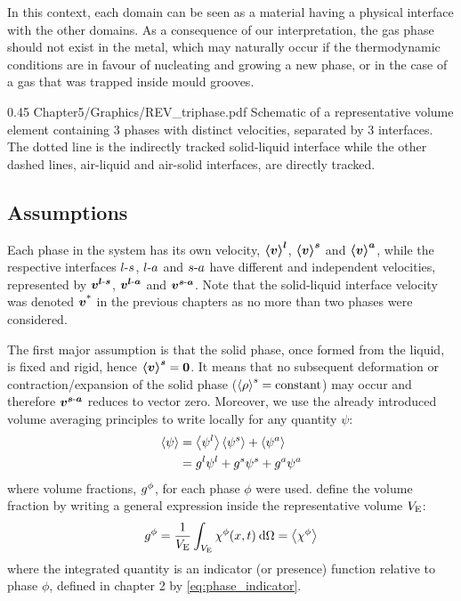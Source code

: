 In this context, each domain can be seen as a material having a physical
interface with the other domains. As a consequence of our interpretation, 
the gas phase should not exist in the metal, which may naturally
occur if the thermodynamic conditions are in favour of nucleating and growing 
a new phase, or in the case of a gas that was trapped inside mould grooves.
\begin{figureth}
{0.45}
{Chapter5/Graphics/REV_triphase.pdf}
{Schematic of a representative volume element containing 3 phases with distinct velocities, separated by 3 interfaces.
The dotted line is the indirectly tracked solid-liquid interface while the other dashed lines, air-liquid and air-solid
interfaces, are directly tracked.}
\label{fig:rev_triphase}
\end{figureth}

\subsection{Assumptions}
Each phase in the system has its own velocity, $\boldsymbol{\left \langle v \right \rangle^l}$, $\boldsymbol{\left \langle v \right \rangle^s}$ and $\boldsymbol{\left \langle v \right \rangle^a}$, while the respective
interfaces $l\text{-}s$, $l\text{-}a$ and $s\text{-}a$ have different and independent velocities, 
represented by $\boldsymbol{v^{l\text{-}s}}$, $\boldsymbol{v^{l\text{-}a}}$ and $\boldsymbol{v^{s\text{-}a}}$. Note that the solid-liquid interface
velocity was denoted $\boldsymbol{v^\text{*}}$ in the previous chapters as no more than two phases were considered.

The first major assumption is that the solid phase, once formed from the liquid, is fixed and rigid, hence $\boldsymbol{\left \langle v \right \rangle^s}=\boldsymbol{0}$.
It means that no subsequent deformation or contraction/expansion of the solid phase ($\left \langle \rho \right \rangle^s=\text{constant}$) may occur and therefore $\boldsymbol{v^{s\text{-}a}}$ reduces to vector zero.
Moreover, we use the already introduced volume averaging principles to write locally for any quantity $\psi$:
\begin{subequations}
\begin{align}
\label{eq:}
\left \langle \psi \right \rangle &= \left \langle \psi^l \right \rangle \left \langle \psi^s \right \rangle + \left \langle \psi^a \right \rangle \\
			&= {g^l} \psi^l + {g^s} \psi^s  + {g^a} \psi^a
\end{align}
\end{subequations}
where volume fractions, ${g^{\phi}} $, for each phase $\phi$ were used. \citet{rappaz_numerical_2003} define
the volume fraction by writing a general expression inside the representative volume $V_\text{E}$:
\begin{align}
\label{eq:}
{g^{\phi}}  = \frac{1}{V_\text{E}} \int_{V_\text{E}} \chi^\phi(x,t)\: \mathrm{d}\Omega = \left \langle \chi^\phi \right \rangle
\end{align}
where the integrated quantity is an indicator (or presence) function relative to phase $\phi$, defined
in chapter 2 by \cref{eq:phase_indicator}.

